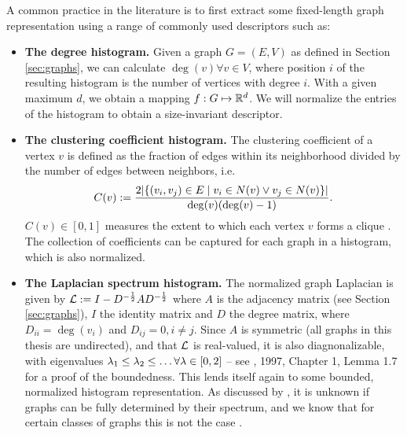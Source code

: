 A common practice in the literature is to first extract some fixed-length graph
representation using a range of commonly used descriptors such as:
\begin{itemize}
\item \textbf{The degree histogram.} Given a graph $G=(E,V)$ as defined in Section
  \ref{sec:graphs}, we can calculate $\deg(v)\forall v\in V$, where
  position $i$ of the resulting histogram is the number of vertices with degree
  $i$. With a given maximum $d$, we obtain a mapping $f:G\mapsto\mathbb{R}^d$. We will
  normalize the entries of the histogram to obtain a size-invariant descriptor.

\item \textbf{The clustering coefficient histogram.} The clustering
  coefficient of a vertex $v$ is defined as the fraction of edges within its
  neighborhood divided by the number of edges between neighbors, i.e.
  \begin{equation}
    C(v) := \frac{2\mleft|\mleft\{(v_i, v_j) \in E \mid  v_i \in N(v) \lor v_j \in N(v) \mright\}\mright|}{\deg(v) \mleft(\deg(v) - 1\mright)}.
  \end{equation}
  $C(v)\in\left[ 0,1 \right]$ measures the extent to which each vertex $v$ forms
  a clique \citep{watts1998collective}. The collection of coefficients can be
  captured for each graph in a histogram, which is also normalized.

\item \textbf{The Laplacian spectrum histogram.} The normalized graph Laplacian
  is given by $\mathcal{L} :=I-D^{-{1\over 2}}AD^{-{1\over 2}}$ where $A$ is the
  adjacency matrix (see Section \ref{sec:graphs}), $I$ the identity
  matrix and $D$ the degree matrix, where $D_{ii}=\deg(v_i)$ and $D_{ij}=0,
  i\neq j$. Since $A$ is symmetric (all graphs in this thesis are undirected),
  and that $\mathcal{L}$ is real-valued, it is also diagnonalizable, with
  eigenvalues $\lambda_1\leq\lambda_2\leq\ldots\forall\lambda\in \left[0,2\right]$ -- see
  \cite{chung1997spectral}, 1997, Chapter 1, Lemma 1.7 for a proof of the boundedness. This lends
  itself again to some bounded, normalized histogram representation. As
  discussed by \cite{o2021evaluation}, it is unknown if graphs can be fully
  determined by their spectrum, and we know that for certain classes of graphs
  this is not the case \citep{schwenk1973almost}.

\end{itemize}

